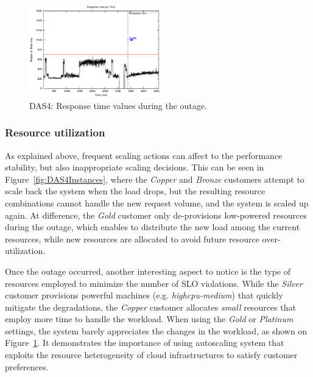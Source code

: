 \begin{figure}[htb]
\begin{minipage}[b]{0.19\linewidth}
	\end{minipage}
\begin{minipage}[b]{0.19\linewidth}
		\includegraphics[width=\linewidth,height=4cm]{images/exps2011/high/das/proxyDataPoints_output.eps}
	\end{minipage}
\caption{DAS4: Response time values during the outage.}
\label{fig:DAS4ResponseTime}
\end{figure}


\subsubsection{Resource utilization}

As explained above, frequent scaling actions can affect to the performance stability, but also inappropriate scaling decisions. This can be seen in Figure~\ref{fig:DAS4Instances}, where the \emph{Copper} and \emph{Bronze} customers attempt to scale back the system when the load drops, but the resulting resource combinations cannot handle the new request volume, and the system is scaled up again.  At difference, the \emph{Gold} customer only de-provisions low-powered resources during the outage, which enables to distribute the new load among the current resources, while new resources are allocated to avoid future resource over-utilization. 

Once the outage occurred, another interesting aspect to notice is the type of resources employed to minimize the number of SLO violations. While the \emph{Silver} customer provisions powerful machines (e.g. \emph{highcpu-medium}) that quickly mitigate the degradations, the \emph{Copper} customer allocates \emph{small} resources that employ more time to handle the workload. When using the \emph{Gold} or \emph{Platinum} settings, the system barely appreciates the changes in the workload, as shown on Figure~\ref{fig:DAS4ResponseTime}. It demonstrates the importance of using autoscaling system that exploits the resource heterogeneity of cloud infrastructures to satisfy customer preferences.

